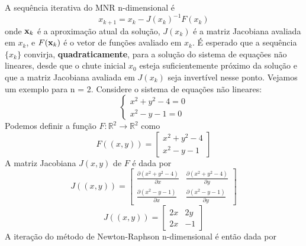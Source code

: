 A sequência iterativa do MNR n-dimensional é
\begin{equation}\label{seqIterNRndim}
    x_{k+1} = x_k - J(x_k)^{-1} F(x_k)
\end{equation}
onde \(\textbf{x}_k\) é a aproximação atual da solução, \(J(x_k)\) é a matriz Jacobiana avaliada em \(x_k\), e \(F(\textbf{x}_k)\) é o vetor de funções avaliado em \(x_k\). É esperado que a sequência \(\{x_k\}\) convirja, \textbf{quadraticamente}, para a solução do sistema de equações não lineares, desde que o chute inicial \(x_0\) esteja suficientemente próximo da solução e que a matriz Jacobiana avaliada em \(J(x_k)\) seja invertível nesse ponto.
Vejamos um exemplo para n = 2. Considere o sistema de equações não lineares:
\begin{equation*}
    \begin{cases}
        x^2 + y^2 - 4 = 0 \\
        x^2 - y - 1 = 0
    \end{cases}
\end{equation*}
Podemos definir a função \(F : \mathbb{R}^2 \rightarrow \mathbb{R}^2\) como
\begin{equation*}
    F((x, y)) = \begin{bmatrix}
        x^2 + y^2 - 4 \\
        x^2 - y - 1
    \end{bmatrix}
\end{equation*}
A matriz Jacobiana \(J(x, y)\) de \(F\) é dada por
\begin{equation*}
    J((x, y)) = \begin{bmatrix}
        \frac{\partial ( x^2 + y^2 - 4 )}{\partial x} & \frac{\partial ( x^2 + y^2 - 4 )}{\partial y} \\
        \frac{\partial ( x^2 - y - 1 )}{\partial x}   & \frac{\partial ( x^2 - y - 1 )}{\partial y}
    \end{bmatrix}
\end{equation*}
\begin{equation*}
    J((x, y)) = \begin{bmatrix}
        2x & 2y \\
        2x & -1
    \end{bmatrix}
\end{equation*}
A iteração do método de Newton-Raphson n-dimensional é então dada por
